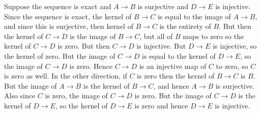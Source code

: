 \documentclass{article}                                                        %
\begin{document}
    \begin{solution}
        Suppose the sequence is exact and $A\rightarrow{B}$ is surjective and
        $D\rightarrow{E}$ is injective. Since the sequence is exact, the kernel
        of $B\rightarrow{C}$ is equal to the image of $A\rightarrow{B}$, and
        since this is surjective, then kernel of $B\rightarrow{C}$ is the
        entirety of $B$. But then the kernel of $C\rightarrow{D}$ is the image
        of $B\rightarrow{C}$, but all of $B$ maps to zero so the kernel of
        $C\rightarrow{D}$ is zero. But then $C\rightarrow{D}$ is injective. But
        $D\rightarrow{E}$ is injective, so
        the kernel of zero. But the image of $C\rightarrow{D}$ is equal to the
        kernel of $D\rightarrow{E}$, so the image of $C\rightarrow{D}$ is zero.
        Hence $C\rightarrow{D}$ is an injective map of $C$ to zero, so $C$ is
        zero as well. In the other direction, if $C$ is zero then the kernel of
        $B\rightarrow{C}$ is $B$. But the image of $A\rightarrow{B}$ is the
        kernel of $B\rightarrow{C}$, and hence $A\rightarrow{B}$ is surjective.
        Also since $C$ is zero, the image of $C\rightarrow{D}$ is zero. But the
        image of $C\rightarrow{D}$ is the kernel of $D\rightarrow{E}$, so the
        kernel of $D\rightarrow{E}$ is zero and hence $D\rightarrow{E}$ is
        injective.
    \end{solution}
\end{document}
